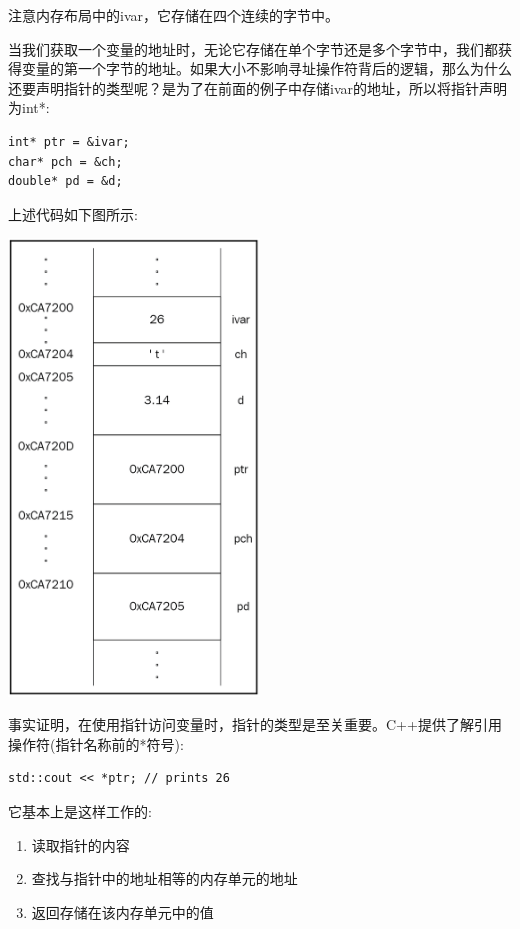 注意内存布局中的ivar，它存储在四个连续的字节中。 \par

当我们获取一个变量的地址时，无论它存储在单个字节还是多个字节中，我们都获得变量的第一个字节的地址。如果大小不影响寻址操作符背后的逻辑，那么为什么还要声明指针的类型呢？是为了在前面的例子中存储ivar的地址，所以将指针声明为int*:\par

\begin{lstlisting}[caption={}]
int* ptr = &ivar;
char* pch = &ch;
double* pd = &d;
\end{lstlisting}

上述代码如下图所示: \par

\begin{center}
	\includegraphics[width=0.5\textwidth]{content/Section-1/Chapter-2/10}
\end{center}

事实证明，在使用指针访问变量时，指针的类型是至关重要。C++提供了解引用操作符(指针名称前的*符号): \par

\begin{lstlisting}[caption={}]
std::cout << *ptr; // prints 26
\end{lstlisting}

它基本上是这样工作的:\par

\begin{enumerate}
	\item 读取指针的内容
	\item 查找与指针中的地址相等的内存单元的地址 
	\item 返回存储在该内存单元中的值
\end{enumerate}

